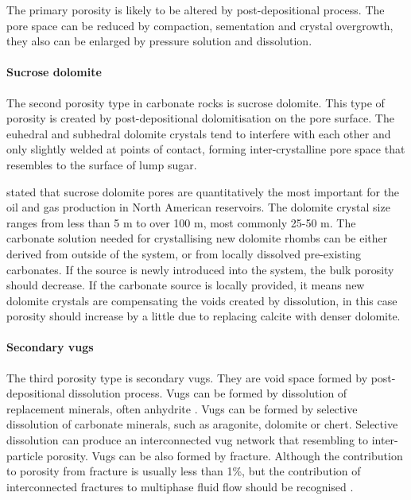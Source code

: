 The primary porosity is likely to be altered by post-depositional process. The pore space can be reduced by compaction, sementation and crystal overgrowth, they also can be enlarged by pressure solution and dissolution.

\paragraph{Sucrose dolomite} 
The second porosity type in carbonate rocks is sucrose dolomite. This type of porosity is created by post-depositional dolomitisation on the pore surface. The euhedral and subhedral dolomite crystals tend to interfere with each other and only slightly welded at points of contact, forming inter-crystalline pore space that resembles to the surface of lump sugar.

\citet{murray1960origin} stated that sucrose dolomite pores are quantitatively the most important for the oil and gas production in North American reservoirs. The dolomite crystal size ranges from less than 5 \textmu m to over 100 \textmu m, most commonly 25-50 \textmu m. The carbonate solution needed for crystallising new dolomite rhombs can be either derived from outside of the system, or from locally dissolved pre-existing carbonates. If the source is newly introduced into the system, the bulk porosity should decrease. If the carbonate source is locally provided, it means new dolomite crystals are compensating the voids created by dissolution, in this case porosity should increase by a little due to replacing calcite with denser dolomite. 

\paragraph{Secondary vugs} 
The third porosity type is secondary vugs. They are void space formed by post-depositional dissolution process. Vugs can be formed by dissolution of replacement minerals, often anhydrite \citep{murray1960origin}. Vugs can be formed by selective dissolution of carbonate minerals, such as aragonite, dolomite or chert. Selective dissolution can produce an interconnected vug network that resembling to inter-particle porosity. Vugs can be also formed by fracture. Although the contribution to porosity from fracture is usually less than 1\%, but the contribution of interconnected fractures to multiphase fluid flow should be recognised \citep{murray1960origin}.

